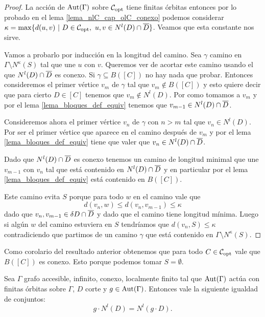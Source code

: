\documentclass[tesis.tex]{subfiles}
\begin{document}
\begin{proof}
	La acción de $\text{Aut}(\Gamma)$ sobre ${\cal C}_{\text{opt}}$ tiene finitas órbitas entonces por lo probado en el lema \ref{lema_nlC_cap_olC_conexo} podemos considerar 
	$\kappa = \max \{ d(u,v) \ | \ D \in \copt, \  u,v \in N^l(D) \cap \ol D  \}$. 	
	Veamos que esta constante nos sirve.
	
	Vamos a probarlo por inducción en la longitud del camino.
	Sea $\gamma$ camino en $\Gamma \setminus N^{\kappa}(S)$ tal que une $u$ con $v$.
	Queremos ver de acortar este camino usando el  que $N^{l}(D) \cap \overline D$ es conexo.
	Si $\gamma \subseteq B([C])$ no hay nada que probar.
	Entonces consideremos el primer vértice $v_m$ de $\gamma$ tal que $v_m \notin B([C])$ y esto quiere decir que para cierto $D \in [C]$ tenemos que $v_m \notin N^l(D)$.
	Por como tomamos a $v_{m}$ y por el lema \ref{lema_bloques_def_equiv} tenemos que $v_{m-1} \in N^l(D) \cap \overline D$.
	
		
	Consideremos ahora el primer vértice $v_n$ de $\gamma$ con $n > m$ tal que $v_n \in N^l(D)$.
	Por ser el primer vértice que aparece en el camino después de $v_{m}$ y por el lema \ref{lema_bloques_def_equiv} tiene que valer que $v_n \in N^l(D) \cap \overline D$.
	
	Dado que $N^l(D) \cap \overline D$ es conexo tenemos un camino de longitud minimal que une $v_{m-1}$ con $v_n$ tal que está contenido en $N^l(D) \cap \overline D$ y en particular por el lema \ref{lema_bloques_def_equiv} está contenido en $B([C])$.
	
	Este camino evita $S$ porque para todo $w$ en el camino vale que 
	\[
		d(v_{n},w) \le d(v_{n},v_{m-1}) \le \kappa
	\]
	dado que $v_{n}, v_{m-1} \in \delta D \cap \overline D$ y dado que el camino tiene longitud mínima.
	Luego si algún $w$ del camino estuviera en $S$ tendríamos que 
	$d(v_n,S) \le \kappa$ contradiciendo que partimos de un camino $\gamma$ que está contenido en $\Gamma \setminus N^{\kappa}(S)$.	
	
\end{proof}


\begin{obs}
	Como corolario del resultado anterior obtenemos que para todo $C \in {\cal C}_{\text{opt}}$ vale que $B([C])$ es conexo.
	Esto porque podemos tomar $S = \emptyset$.
\end{obs}

\begin{lema}\label{lema_accion_vecinos}
	Sea $\Gamma$ grafo accesible, infinito, conexo, localmente finito tal que $\text{Aut}(\Gamma)$ actúa con finitas órbitas sobre $\Gamma$, $D$ corte y $g \in \text{Aut}(\Gamma)$. 
	Entonces vale la siguiente igualdad de conjuntos:
	\[
		g \cdot N^l(D) = N^l(g \cdot D).
	\]
\end{lema}
\end{document}
